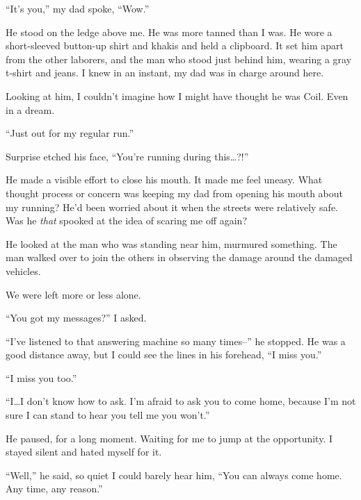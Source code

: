 ``It's you,'' my dad spoke, ``Wow.''



He stood on the ledge above me.  He was more tanned than I was.  He wore a short-sleeved button-up shirt and khakis and held a clipboard.  It set him apart from the other laborers, and the man who stood just behind him, wearing a gray t-shirt and jeans.  I knew in an instant, my dad was in charge around here.



Looking at him, I couldn't imagine how I might have thought he was Coil.  Even in a dream.



``Just out for my regular run.''



Surprise etched his face, ``You're running during this\ldots?!''



He made a visible effort to close his mouth.  It made me feel uneasy.  What thought process or concern was keeping my dad from opening his mouth about my running?  He'd been worried about it when the streets were relatively safe.  Was he \emph{that} spooked at the idea of scaring me off again?



He looked at the man who was standing near him, murmured something.  The man walked over to join the others in observing the damage around the damaged vehicles.



We were left more or less alone.



``You got my messages?''  I asked.



``I've listened to that answering machine so many times--'' he stopped.  He was a good distance away, but I could see the lines in his forehead, ``I miss you.''



``I miss you too.''



``I\ldots I don't know how to ask.  I'm afraid to ask you to come home, because I'm not sure I can stand to hear you tell me you won't.''



He paused, for a long moment.  Waiting for me to jump at the opportunity.  I stayed silent and hated myself for it.



``Well,'' he said, so quiet I could barely hear him, ``You can always come home.  Any time, any reason.''



